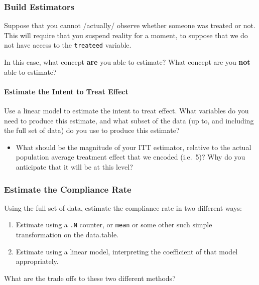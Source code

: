 \documentclass[
]{article}
\providecommand{\tightlist}{%
  \setlength{\itemsep}{0pt}\setlength{\parskip}{0pt}}
\theoremstyle{definition}
\theoremstyle{definition}
\theoremstyle{definition}
\theoremstyle{definition}
\theoremstyle{remark}
\begin{document}
\subsubsection{Build Estimators}\label{build-estimators}

Suppose that you cannot /actually/ observe whether someone was treated or not. This will require that you suspend reality for a moment, to suppose that we do not have access to the \texttt{treateed} variable.

In this case, what concept \textbf{are} you able to estimate? What concept are you \textbf{not} able to estimate?

\paragraph{Estimate the Intent to Treat Effect}\label{estimate-the-intent-to-treat-effect}

Use a linear model to estimate the intent to treat effect. What variables do you need to produce this estimate, and what subset of the data (up to, and including the full set of data) do you use to produce this estimate?

\begin{itemize}
\tightlist
\item
  What should be the magnitude of your ITT estimator, relative to the actual population average treatment effect that we encoded (i.e.~5)? Why do you anticipate that it will be at this level?
\end{itemize}

\subsubsection{Estimate the Compliance Rate}\label{estimate-the-compliance-rate}

Using the full set of data, estimate the compliance rate in two different ways:

\begin{enumerate}
\def\labelenumi{\arabic{enumi}.}
\tightlist
\item
  Estimate using a \texttt{.N} counter, or \texttt{mean} or some other such simple transformation on the data.table.
\item
  Estimate using a linear model, interpreting the coefficient of that model appropriately.
\end{enumerate}

What are the trade offs to these two different methods?
\end{document}
